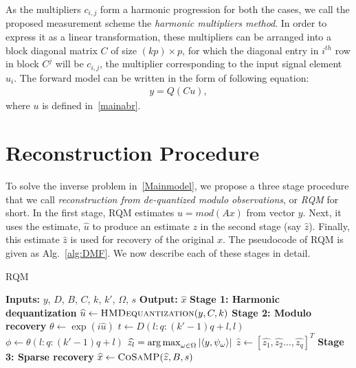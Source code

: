 As the multipliers $c_{i,j}$ form a harmonic progression for both the cases, we call the proposed measurement scheme the \emph{harmonic multipliers method}. In order to express it as a linear transformation, these multipliers can be arranged into a block diagonal matrix $C$ of size $(kp) \times p$, for which the diagonal entry in $i^{th}$ row in block $C^j$ will be $c_{i,j}$, the multiplier corresponding to the input signal element $u_i$. 
The forward model can be written in the form of following equation:
\begin{align}
y = Q(Cu),
\end{align}
where $u$ is defined in~\eqref{mainabr}.


\section{Reconstruction Procedure}
To solve the inverse problem in~\eqref{Mainmodel}, we propose a three stage procedure that we call \textit{reconstruction from de-quantized modulo observations}, or \textit{RQM} for short. In the first stage, RQM estimates $u= mod(Ax)$ from vector $y$. Next, it uses the estimate, $\widehat{u}$ to produce an estimate $z$ in the second stage (say $\widehat{z}$). Finally, this estimate $\widehat{z}$ is used for recovery of the original $x$. The pseudocode of RQM is given as Alg.~\ref{alg:DMF}.  We now describe each of these stages in detail. 

\begin{algorithm}[t]
\caption{\textsc{RQM}}
\label{alg:DMF}
\begin{algorithmic}
\State\textbf{Inputs:} $y$, $D$, $B$, $C$, $k$, $k'$, $\Omega$, $s$
\State\textbf{Output:}  $\widehat{x}$
\State \textbf{Stage 1: Harmonic dequantization}
\State $\widehat{u}\leftarrow \textsc{HMDequantization}(y,C,k)$
\State \textbf{Stage 2: Modulo recovery}
\State $\theta\leftarrow  \exp(i \widehat{u})$
\State $t \leftarrow D(l:q:(k'-1)q+l,l)$
\State $\phi \leftarrow \theta(l:q:(k'-1)q+l)$
\State $\widehat{z_l} = \operatorname*{arg\,max}_{\omega\in\Omega}|\langle y,\psi_{\omega}\rangle|$
\EndFor
\State $\widehat{z} \leftarrow [\widehat{z_1},\widehat{z_2}\ldots,\widehat{z_q}]^T$
\State \textbf{Stage 3: Sparse recovery}
\State $\widehat{x} \leftarrow \textsc{CoSaMP}(\widehat{z},B,s)$
\end{algorithmic}
\end{algorithm}

